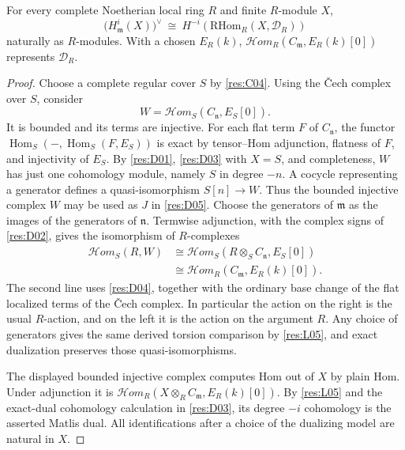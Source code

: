\begin{theorem}\label{res:D06}
For every complete Noetherian local ring $R$ and finite $R$-module $X$,
\[
 \bigl(H^i_{\mathfrak m}(X)\bigr)^\vee
     \ \cong\ H^{-i}\!\left(\mathrm{RHom}_R(X,\mathcal D_R)\right)
\]
naturally as $R$-modules. With a chosen $E_R(k)$,
$\mathcal H om_R(C_{\mathfrak m},E_R(k)[0])$ represents
$\mathcal D_R$.
\end{theorem}
\begin{proof}
Choose a complete regular cover $S$ by \ref{res:C04}.
Using the \v{C}ech complex over $S$, consider
\[
                W=\mathcal H om_S(C_{\mathfrak n},E_S[0]).
\]
It is bounded and its terms are injective. For each flat term
$F$ of $C_{\mathfrak n}$, the functor
$\operatorname{Hom}_S(-,\operatorname{Hom}_S(F,E_S))$
is exact by tensor--Hom adjunction, flatness of $F$, and
injectivity of $E_S$. By \ref{res:D01}, \ref{res:D03} with
$X=S$, and completeness, $W$ has just one cohomology module,
namely $S$ in degree $-n$. A cocycle representing a generator
defines a quasi-isomorphism $S[n]\to W$. Thus the bounded
injective complex $W$ may be used as $J$ in \ref{res:D05}.
Choose the generators of $\mathfrak m$ as the images of the
generators of $\mathfrak n$. Termwise adjunction, with the
complex signs of \ref{res:D02}, gives the isomorphism of
$R$-complexes
\[
 \begin{aligned}
 \mathcal H om_S(R,W)
 &\cong \mathcal H om_S(R\otimes_S C_{\mathfrak n},E_S[0])\\
 &\cong \mathcal H om_R(C_{\mathfrak m},E_R(k)[0]).
 \end{aligned}
\]
The second line uses \ref{res:D04}, together with the ordinary
base change of the flat localized terms of the \v{C}ech complex.
In particular the action on the right is the usual $R$-action,
and on the left it is the action on the argument $R$.
Any choice of generators gives the same derived torsion
comparison by \ref{res:L05}, and exact dualization preserves
those quasi-isomorphisms.

The displayed bounded injective complex computes Hom out of $X$
by plain Hom. Under adjunction it is
$\mathcal H om_R(X\otimes_R C_{\mathfrak m},E_R(k)[0])$.
By \ref{res:L05} and the exact-dual cohomology calculation in
\ref{res:D03}, its degree $-i$ cohomology is the asserted
Matlis dual. All identifications after a choice of the dualizing
model are natural in $X$.
\end{proof}


